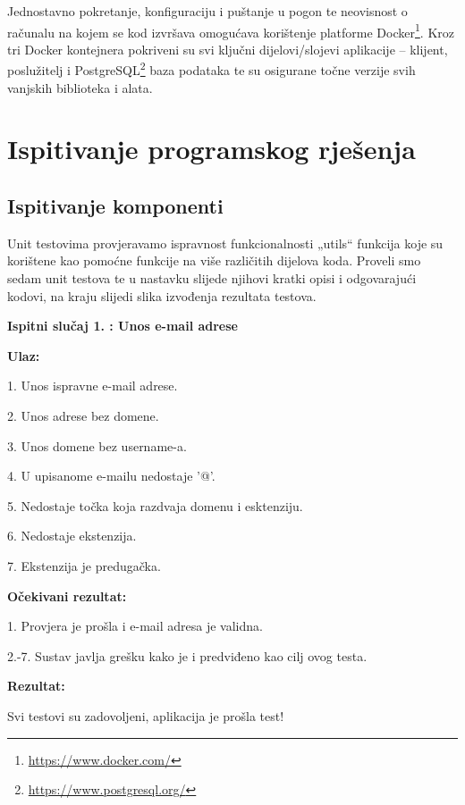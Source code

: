 \noindent Jednostavno pokretanje, konfiguraciju i puštanje u pogon te neovisnost o računalu na kojem se kod izvršava omogućava korištenje platforme Docker\footnote{\url{https://www.docker.com/}}. Kroz tri Docker kontejnera pokriveni su svi ključni dijelovi/slojevi aplikacije – klijent, poslužitelj i PostgreSQL\footnote{\url{https://www.postgresql.org/}} baza podataka te su osigurane točne verzije svih vanjskih biblioteka i alata.

			
			
			\eject 
		
	
		\section{Ispitivanje programskog rješenja}
			
							
			\subsection{Ispitivanje komponenti}
			Unit testovima provjeravamo ispravnost funkcionalnosti „utils“ funkcija koje su korištene kao pomoćne funkcije na više različitih dijelova koda.
Proveli smo sedam unit testova te u nastavku slijede njihovi kratki opisi i odgovarajući kodovi, na kraju slijedi slika izvođenja rezultata testova.

 \textbf{Ispitni slučaj 1. : Unos e-mail adrese}  

                \textbf{Ulaz:}

                1. Unos ispravne e-mail adrese.

                2. Unos adrese bez domene.

                3. Unos domene bez username-a.

                4. U upisanome e-mailu nedostaje '@'.

                5. Nedostaje točka koja razdvaja domenu i esktenziju.

                6. Nedostaje ekstenzija.

                7. Ekstenzija je predugačka.

                \textbf{Očekivani rezultat:}

                1. Provjera je prošla i e-mail adresa je validna.

                2.-7. Sustav javlja grešku kako je i predviđeno kao cilj ovog testa. 

                \textbf{Rezultat:} 

                Svi testovi su zadovoljeni, aplikacija je prošla test!

